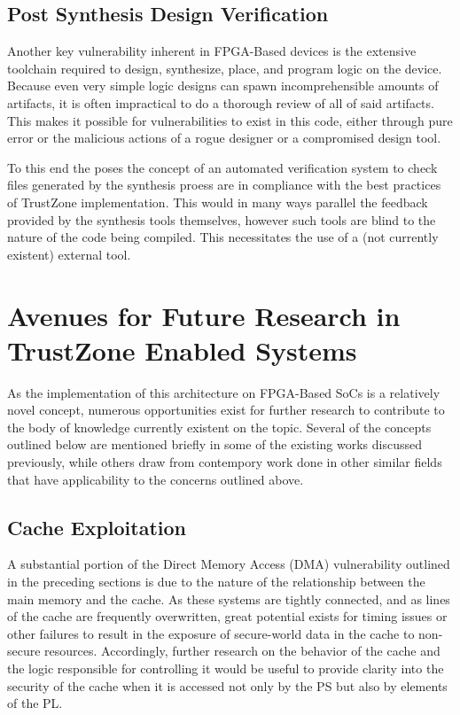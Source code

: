 \documentclass[journal]{IEEEtran}
\begin{document}
\subsection{Post Synthesis Design Verification}
Another key vulnerability inherent in FPGA-Based devices is the extensive toolchain
required to design, synthesize, place, and program logic on the device. Because even very
simple logic designs can spawn incomprehensible amounts of artifacts, it is often
impractical to do a thorough review of all of said artifacts. This makes it possible for
vulnerabilities to exist in this code, either through pure error or the malicious actions
of a rogue designer or a compromised design tool. 

To this end the \cite{benhani_security_2019} poses the concept of an automated
verification system to check files generated by the synthesis proess are in compliance
with the best practices of TrustZone implementation. This would in many ways parallel the
feedback provided by the synthesis tools themselves, however such tools are blind to the
nature of the code being compiled. This necessitates the use of a (not currently existent)
external tool.

\section{Avenues for Future Research in TrustZone Enabled Systems}
As the implementation of this architecture on FPGA-Based SoCs is a relatively novel
concept, numerous opportunities exist for further research to contribute to the body of
knowledge currently existent on the topic. Several of the concepts outlined below are
mentioned briefly in some of the existing works discussed previously, while others draw
from contempory work done in other similar fields that have applicability to the concerns
outlined above.

\subsection{Cache Exploitation}
A substantial portion of the Direct Memory Access (DMA) vulnerability outlined in the 
preceding sections is due to the nature of the relationship between the main memory and
the cache. As these systems are tightly connected, and as lines of the cache are
frequently overwritten, great potential exists for timing issues or other failures to
result in the exposure of secure-world data in the cache to non-secure resources.
Accordingly, further research on the behavior of the cache and the logic responsible for
controlling it would be useful to provide clarity into the security of the cache when it
is accessed not only by the PS but also by elements of the PL.
\end{document}
